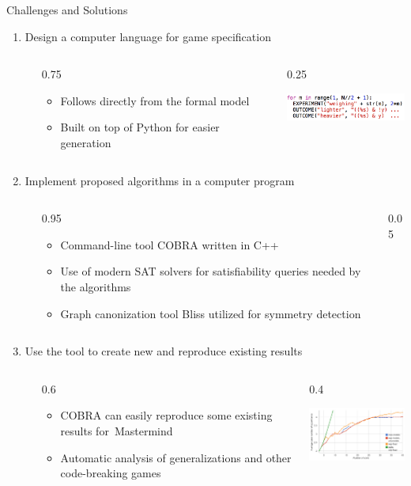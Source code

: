 \documentclass[final]{beamer}
\newcommand{\thando}[4]{
\begin{columns}[T]
\begin{column}{\leftmarginii}
\end{column}
\begin{column}{#3\textwidth}
\vspace{-1.5mm}
\begin{itemize}
#1
\end{itemize}
\end{column}
\begin{column}{#4\textwidth}
#2
\end{column}
\end{columns}\medskip}
\begin{document}
\begin{frame}{}
\begin{columns}[t]
\begin{column}{.48\linewidth}
\begin{block}{Challenges and Solutions}
\begin{enumerate}
{        }{0.65}{0.35}
      \item Design a computer language for game specification
        \thando{
        \item Follows directly from the formal model
        \item Built on top of Python for easier generation
        }{
          \hspace{-22mm}
          \includegraphics[width=4cm]{img-language.png}
        }{0.75}{0.25}
      \item Implement proposed algorithms in a computer program
        \thando{
        \item Command-line tool COBRA written in C++
        \item Use of modern SAT solvers for satisfiability queries needed by the algorithms
        \item Graph canonization tool Bliss utilized for symmetry detection
        }{

        }{0.95}{0.05}
      \item Use the tool to create new and reproduce existing results
        \thando{
        \item COBRA can easily reproduce some existing results for~Mastermind
        \item Automatic analysis of generalizations and other code-breaking games
        }{
          \hspace{-5mm}
          \includegraphics[width=4.5cm]{img-results.png}
        }{0.6}{0.4}
      \end{enumerate}
    \end{block}       
  \end{column}
\end{columns}
\vfill
\end{frame}
\end{document}
